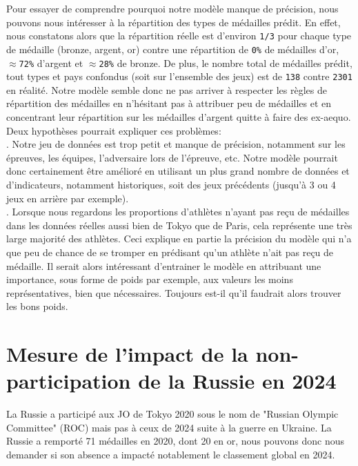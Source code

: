 \documentclass{article}
\begin{document}
Pour essayer de comprendre pourquoi notre modèle manque de précision, nous pouvons nous intéresser à la répartition des types de médailles prédit. En effet, nous constatons alors que la répartition réelle est d'environ \verb|1/3| pour chaque type de médaille (bronze, argent, or) contre une répartition de \verb|0%| de médailles d'or,  $\approx$\verb|72%| d'argent et $\approx$\verb|28%| de bronze. De plus, le nombre total de médailles prédit, tout types et pays confondus (soit sur l'ensemble des jeux) est de \verb|138| contre \verb|2301| en réalité. Notre modèle semble donc ne pas arriver à respecter les règles de répartition des médailles en n'hésitant pas à attribuer peu de médailles et en concentrant leur répartition sur les médailles d'argent quitte à faire des ex-aequo.
\\

Deux hypothèses pourrait expliquer ces problèmes:
\\

\indent{}. Notre jeu de données est trop petit et manque de précision, notamment sur les épreuves, les équipes, l'adversaire lors de l'épreuve, etc. Notre modèle pourrait donc certainement être amélioré en utilisant un plus grand nombre de données et d'indicateurs, notamment historiques, soit des jeux précédents (jusqu'à 3 ou 4 jeux en arrière par exemple).
\\

\indent{}. Lorsque nous regardons les proportions d'athlètes n'ayant pas reçu de médailles dans les données réelles aussi bien de Tokyo que de Paris, cela représente une très large majorité des athlètes. Ceci explique en partie la précision du modèle qui n'a que peu de chance de se tromper en prédisant qu'un athlète n'ait pas reçu de médaille. Il serait alors intéressant d'entrainer le modèle en attribuant une importance, sous forme de poids par exemple, aux valeurs les moins représentatives, bien que nécessaires. Toujours est-il qu'il faudrait alors trouver les bons poids.

\section{Mesure de l'impact de la non-participation de la Russie en 2024}
La Russie a participé aux JO de Tokyo 2020 sous le nom de "Russian Olympic Committee" (ROC) mais pas à ceux de 2024 suite à la guerre en Ukraine. La Russie a remporté 71 médailles en 2020, dont 20 en or, nous pouvons donc nous demander si son absence a impacté notablement le classement global en 2024.
\end{document}

